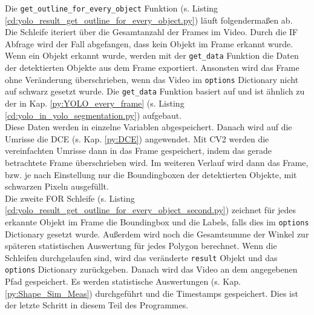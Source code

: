 {	Die \lstinline|get_outline_for_every_object| Funktion \ifimportant (s. Listing \ref{cd:yolo_result_get_outline_for_every_object.py}) \fi läuft folgendermaßen ab. \\
	Die Schleife iteriert über die Gesamtanzahl der Frames im Video. Durch die IF Abfrage wird der Fall abgefangen, dass kein Objekt im Frame erkannt wurde. Wenn ein Objekt erkannt wurde, werden mit der \lstinline|get_data| Funktion die Daten der detektierten Objekte aus dem Frame exportiert. Ansonsten wird das Frame ohne Veränderung überschrieben, wenn das Video im \lstinline|options| Dictionary nicht auf schwarz gesetzt wurde. Die \lstinline|get_data| Funktion basiert auf \citeauthor{Canu_pysource} \citep{Canu_pysource} und ist ähnlich zu der in Kap. \ref{py:YOLO_every_frame} \ifimportant (s. Listing \ref{cd:yolo_in_yolo_segmentation.py}) \fi aufgebaut. \\
	Diese Daten werden in einzelne Variablen abgespeichert. Danach wird auf die Umrisse die DCE (s. Kap. \ref{py:DCE}) angewendet. Mit CV2 werden die vereinfachten Umrisse dann in das Frame gespeichert, indem das gerade betrachtete Frame überschrieben wird. Im weiteren Verlauf wird dann das Frame, bzw. je nach Einstellung nur die Boundingboxen der detektierten Objekte, mit schwarzen Pixeln ausgefüllt. \\
	\ifimportant
	\fi Die zweite FOR Schleife \ifimportant (s. Listing \ref{cd:yolo_result_get_outline_for_every_object_second.py}) \fi zeichnet für jedes erkannte Objekt im Frame die Boundingbox und die Labels, falls dies im \lstinline|options| Dictionary gesetzt wurde. Außerdem wird noch die Gesamtsumme der Winkel  zur späteren statistischen Auswertung für jedes Polygon berechnet.
	\ifimportant
	\fi Wenn die Schleifen durchgelaufen sind, wird das veränderte \lstinline|result| Objekt und das \lstinline|options| Dictionary zurückgeben. Danach wird das Video an dem angegebenen Pfad gespeichert. Es werden statistische Auswertungen (s. Kap. \ref{py:Shape_Sim_Meas}) durchgeführt und die Timestamps gespeichert. Dies ist der letzte Schritt in diesem Teil des  Programmes. \\
	}

